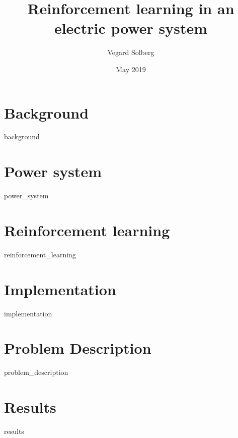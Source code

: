 \documentclass{book}
\title{Reinforcement learning in an electric power system}
\author{Vegard Solberg}
\date{May 2019}
\begin{document}
 
    \maketitle
    \tableofcontents
    
    \chapter{Background}
    {background}
    
    
    \chapter{Power system}
    {power_system}
 
    \chapter{Reinforcement learning}
    {reinforcement_learning}
    
    \chapter{Implementation}
    {implementation}
    
    \chapter{Problem Description}
    {problem_description}
    
    \chapter{Results}
    {results}
    
    \printbibliography
\end{document}
